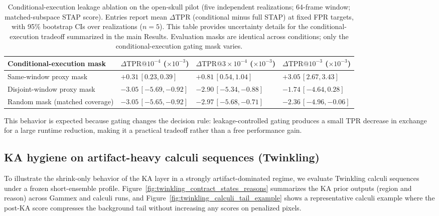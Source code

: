 \begin{table}[t]
\centering
\scriptsize
\begingroup
\setlength{\tabcolsep}{4pt}
\begin{tabular}{P{3.0cm} C{2.9cm} C{2.9cm} C{2.9cm}}
\hline
Conditional-execution mask & $\Delta\mathrm{TPR}@10^{-4}$ ($\times 10^{-3}$) & $\Delta\mathrm{TPR}@3\!\times\!10^{-4}$ ($\times 10^{-3}$) & $\Delta\mathrm{TPR}@10^{-3}$ ($\times 10^{-3}$) \\
\hline
Same-window proxy mask & $+0.31\,[0.23,0.39]$ & $+0.81\,[0.54,1.04]$ & $+3.05\,[2.67,3.43]$ \\
Disjoint-window proxy mask & $-3.05\,[-5.69,-0.92]$ & $-2.90\,[-5.34,-0.88]$ & $-1.74\,[-4.64,0.28]$ \\
Random mask (matched coverage) & $-3.05\,[-5.65,-0.92]$ & $-2.97\,[-5.68,-0.71]$ & $-2.36\,[-4.96,-0.06]$ \\
\hline
\end{tabular}
\endgroup
\caption{Conditional-execution leakage ablation on the open-skull pilot (five independent realizations; 64-frame window; matched-subspace STAP score). Entries report mean $\Delta\mathrm{TPR}$ (conditional minus full STAP) at fixed FPR targets, with 95\% bootstrap CIs over realizations ($n=5$). This table provides uncertainty details for the conditional-execution tradeoff summarized in the main Results. Evaluation masks are identical across conditions; only the conditional-execution gating mask varies.}
\label{tab:condstap_leakage_ablation}
\end{table}
\noindent This behavior is expected because gating changes the decision rule: leakage-controlled gating produces a small TPR decrease in exchange for a large runtime reduction, making it a practical tradeoff rather than a free performance gain.

\subsection{KA hygiene on artifact-heavy calculi sequences (Twinkling)}
To illustrate the shrink-only behavior of the KA layer in a strongly artifact-dominated regime, we evaluate Twinkling calculi sequences under a frozen short-ensemble profile. Figure~\ref{fig:twinkling_contract_states_reasons} summarizes the KA prior outputs (region and reason) across Gammex and calculi runs, and Figure~\ref{fig:twinkling_calculi_tail_example} shows a representative calculi example where the post-KA score compresses the background tail without increasing any scores on penalized pixels.

